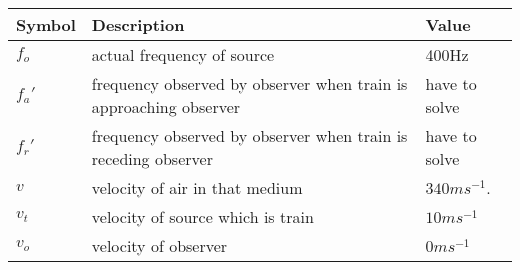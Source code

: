 
\begin{tabular}{ | m{1.0cm} | m{3cm} |m{1.5cm}| } 
  \hline
 \textbf{Symbol} & \textbf{Description}  & \textbf{Value} \\
 \hline
 $f_o$ & actual frequency of source & 400Hz\\
\hline
$f_a'$ & frequency observed by observer when train is approaching observer & have to solve \\
\hline
 $f_r'$ &  frequency observed by observer when train is receding observer  & have to solve \\
\hline
 $v$ & velocity of air in that medium &  $340 ms^{-1} $.\\
\hline
$v_t$ & velocity of source which is train  &  $10 ms^{-1} $ \\
\hline
$v_o$ & velocity of observer  &  $0 ms^{-1} $ \\
\hline
\end{tabular}
